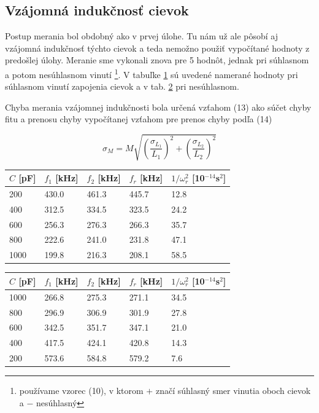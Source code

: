 \documentclass{article}
\begin{document}
\subsection{Vzájomná indukčnosť cievok}
Postup merania bol obdobný ako v prvej úlohe. Tu nám už ale pôsobí aj vzájomná indukčnosť týchto cievok a teda nemožno použiť vypočítané hodnoty z predošlej úlohy. Meranie sme vykonali znova pre 5 hodnôt, jednak pri súhlasnom a potom nesúhlasnom vinutí \footnote{používame vzorec (10), v ktorom $+$ značí súhlasný smer vinutia oboch cievok a $-$ nesúhlasný}. V tabuľke \ref{tab:cvAB} sú uvedené namerané hodnoty pri súhlasnom vinutí zapojenia cievok a v tab. \ref{tab:cvBA} pri nesúhlasnom. 

Chyba merania vzájomnej indukčnosti bola určená vzťahom (13) ako súčet chyby fitu a prenosu chyby vypočítanej vzťahom pre prenos chyby podľa (14)

\begin{equation}
    \sigma_M = M \sqrt{\left(\frac{\sigma_{L_1}}{L_1}\right)^2 + \left(\frac{\sigma_{L_2}}{L_2}\right)^2}
\end{equation}

\begin{table}[!htbp]
\label{tab:cvAB}
\centering
\begin{tabular}{|l|l|l|l|l|}
\hline
$C$ [pF] & $f_1$ [kHz] & $f_2$ [kHz] &   $f_r$ [kHz]    &   $1/\omega_r^2$ [10$^{-14}$s$^2$]   \\ \hline
200     & 430.0   & 461.3   & 445.7 & 12.8 \\ \hline
400     & 312.5   & 334.5   & 323.5 & 24.2 \\ \hline
600     & 256.3   & 276.3   & 266.3 & 35.7 \\ \hline
800     & 222.6   & 241.0   & 231.8 & 47.1 \\ \hline
1000    & 199.8   & 216.3   & 208.1 & 58.5 \\ \hline
\end{tabular}
\end{table}

\begin{table}[!htbp]
\label{tab:cvBA}
\centering
\begin{tabular}{|l|l|l|l|l|}
\hline
$C$ [pF] & $f_1$ [kHz] & $f_2$ [kHz] &   $f_r$ [kHz]    &   $1/\omega_r^2$ [10$^{-14}$s$^2$]   \\ \hline
1000    & 266.8   & 275.3   & 271.1 & 34.5 \\ \hline
800     & 296.9   & 306.9   & 301.9 & 27.8 \\ \hline
600     & 342.5   & 351.7   & 347.1 & 21.0 \\ \hline
400     & 417.5   & 424.1   & 420.8 & 14.3 \\ \hline
200     & 573.6   & 584.8   & 579.2 & 7.6  \\ \hline
\end{tabular}
\end{table}
\end{document}
